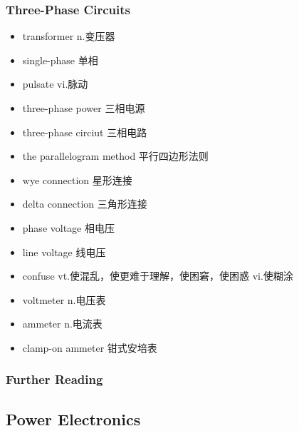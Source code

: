 \documentclass[11pt,a4paper,UTF8,titlepage]{ctexart} %
\begin{document}
    \subsubsection{Three-Phase Circuits}
    \begin{multicols}{2}
        \begin{itemize}
            \item transformer n.变压器
            \item single-phase 单相
            \item pulsate vi.脉动
            \item three-phase power 三相电源
            \item three-phase circiut 三相电路
            \item the parallelogram method 平行四边形法则
            \item wye connection 星形连接
            \item delta connection 三角形连接
            \item phase voltage 相电压
            \item line voltage 线电压
            \item confuse vt.使混乱，使更难于理解，使困窘，使困惑 vi.使糊涂
            \item voltmeter n.电压表
            \item ammeter n.电流表
            \item clamp-on ammeter 钳式安培表
        \end{itemize}
    \end{multicols}

    \subsubsection{Further Reading}

    \subsection{Power Electronics}
\end{document}
